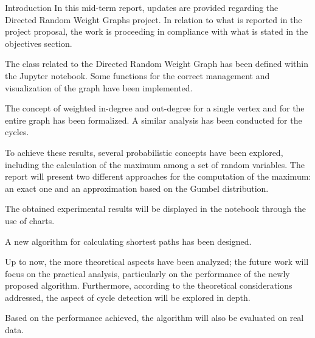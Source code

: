 \begin{projsection}{Introduction}
In this mid-term report, updates are provided regarding the Directed Random Weight Graphs project. In relation to what is reported in the project proposal, the work is proceeding in compliance with what is stated in the objectives section. 

The class related to the Directed Random Weight Graph has been defined within the Jupyter notebook. Some functions for the correct management and visualization of the graph have been implemented.

The concept of weighted in-degree and out-degree for a single vertex and for the entire graph has been formalized.
A similar analysis has been conducted for the cycles.

To achieve these results, several probabilistic concepts have been explored, including the calculation of the maximum among a set of random variables.
The report will present two different approaches for the computation of the maximum: an exact one and an approximation based on the Gumbel distribution.

The obtained experimental results will be displayed in the notebook through the use of charts. 

A new algorithm for calculating shortest paths has been designed.

Up to now, the more theoretical aspects have been analyzed; the future work will focus on the practical analysis, particularly on the performance of the newly proposed algorithm.
Furthermore, according to the theoretical considerations addressed, the aspect of cycle detection will be explored in depth. 

Based on the performance achieved, the algorithm will also be evaluated on real data. 
\end{projsection}

